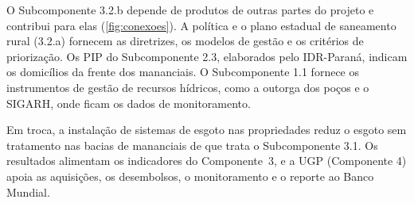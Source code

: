 O Subcomponente 3.2.b depende de produtos de outras partes do projeto e
contribui para elas (\autoref{fig:conexoes}). A política e o plano estadual de
saneamento rural (3.2.a) fornecem as diretrizes, os modelos de gestão e os
critérios de priorização. Os PIP do Subcomponente 2.3, elaborados pelo
IDR-Paraná, indicam os domicílios da frente dos mananciais. O Subcomponente
1.1 fornece os instrumentos de gestão de recursos hídricos, como a outorga dos
poços e o SIGARH, onde ficam os dados de monitoramento.

Em troca, a instalação de sistemas de esgoto nas propriedades reduz o esgoto
sem tratamento nas bacias de mananciais de que trata o Subcomponente 3.1. Os
resultados alimentam os indicadores do Componente~3, e a UGP (Componente 4)
apoia as aquisições, os desembolsos, o monitoramento e o reporte ao Banco
Mundial.

